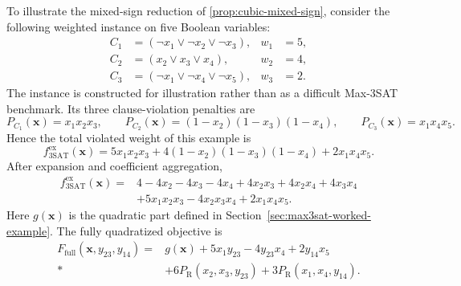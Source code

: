 \documentclass[a4paper,onecolumn,11pt,unpublished]{quantumarticle}
\newcommand{\PR}{P_{\mathrm R}}
\theoremstyle{remark}
\begin{document}
To illustrate the mixed-sign reduction of \cref{prop:cubic-mixed-sign}, consider
the following weighted instance on five
Boolean variables:
\begin{equation}
    \begin{aligned}
        C_1&=(\neg x_1\lor\neg x_2\lor\neg x_3), & w_1&=5,\\
        C_2&=(x_2\lor x_3\lor x_4),              & w_2&=4,\\
        C_3&=(\neg x_1\lor\neg x_4\lor\neg x_5), & w_3&=2.
    \end{aligned}
    \label{eq:max3sat-worked-clauses}
\end{equation}
The instance is constructed for illustration rather than as a difficult
Max-3SAT benchmark. Its three clause-violation penalties are
\begin{equation}
    P_{C_1}(\bm x)=x_1x_2x_3,\qquad
    P_{C_2}(\bm x)=(1-x_2)(1-x_3)(1-x_4),\qquad
    P_{C_3}(\bm x)=x_1x_4x_5.
    \label{eq:max3sat-worked-clause-penalties}
\end{equation}
Hence the total violated weight of this example is
\begin{equation}
    f_{\mathrm{3SAT}}^{\mathrm{ex}}(\bm x)
    =5x_1x_2x_3
     +4(1-x_2)(1-x_3)(1-x_4)
     +2x_1x_4x_5.
    \label{eq:max3sat-worked-objective}
\end{equation}
After expansion and coefficient aggregation,
\begin{align}
    f_{\mathrm{3SAT}}^{\mathrm{ex}}(\bm x)
    ={}&4-4x_2-4x_3-4x_4
       +4x_2x_3+4x_2x_4+4x_3x_4 \nonumber\\
      &+5x_1x_2x_3-4x_2x_3x_4+2x_1x_4x_5.
    \label{eq:max3sat-worked-full-expansion}
\end{align}
Here $g(\bm x)$ is the quadratic part defined in
Section~\ref{sec:max3sat-worked-example}. The fully quadratized objective is
\begin{align}
    F_{\mathrm{full}}(\bm x,y_{23},y_{14})
    ={}&g(\bm x)+5x_1y_{23}-4y_{23}x_4+2y_{14}x_5 \nonumber\\*
      &+6\PR(x_2,x_3,y_{23})
       +3\PR(x_1,x_4,y_{14}).
    \label{eq:max3sat-worked-full}
\end{align}
\end{document}
